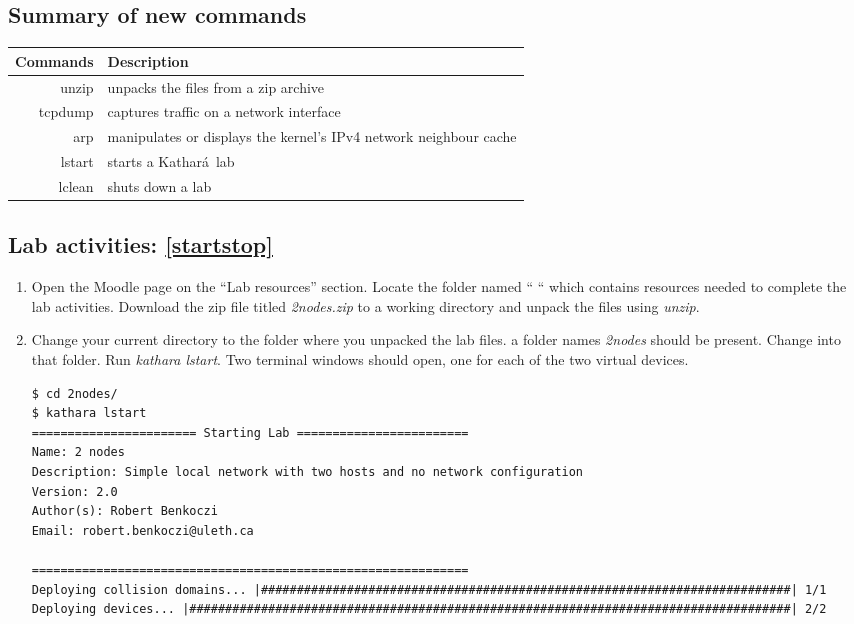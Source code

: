 \documentclass[12pt]{book}
\newcommand{\kathara}{Kathar\'a}
\begin{document}
\begin{enumerate}[label=\arabic*.]
\subsection{Summary of new commands}

\begin{tabularx}{\textwidth}{r  X}
  Commands & Description \\ \midrule
  unzip & unpacks the files from a zip archive \\
  tcpdump & captures traffic on a network interface \\
  arp & manipulates  or displays the kernel's IPv4 network neighbour cache \\ \midrule
  lstart & starts a \kathara\ lab \\
  lclean & shuts down a lab
\end{tabularx}


\subsection{Lab activities: \ref{startstop}}\label{2nodes.se}

\begin{enumerate}[label=Activity \arabic*:]
\item Open the Moodle page on the ``Lab resources'' section. Locate the folder named `` `` which contains resources needed to complete the lab activities. Download the zip file titled \emph{2nodes.zip} to a working directory and unpack the files using \emph{unzip}. 
  
\item Change your current directory to the folder where you unpacked
  the lab files. a folder names \emph{2nodes} should be present. Change into that folder. Run \emph{kathara lstart}. Two terminal windows should open, one for each of the two virtual devices.

  \begin{lstlisting}
$ cd 2nodes/
$ kathara lstart
======================= Starting Lab ========================
Name: 2 nodes
Description: Simple local network with two hosts and no network configuration
Version: 2.0
Author(s): Robert Benkoczi
Email: robert.benkoczi@uleth.ca

=============================================================
Deploying collision domains... |##########################################################################| 1/1
Deploying devices... |####################################################################################| 2/2
  \end{lstlisting}


\end{enumerate}
\end{enumerate}
\end{document}
